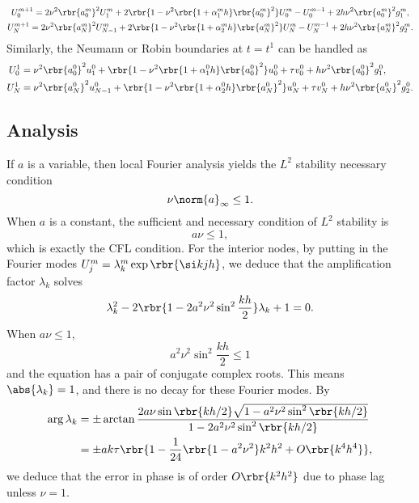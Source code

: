 \documentclass[english, nochinese]{pnote}
\begin{document}
\begin{gather}
U_0^{ m + 1 } = 2 \nu^2 \rbr{a_0^m}^2 U_1^m + 2 \rbr{ 1 - \nu^2 \rbr{ 1 + \alpha_1^m h } \rbr{a_0^m}^2 } U_0^m - U_0^{ m - 1 } + 2 h \nu^2 \rbr{a_0^m}^2 g_1^m, \\
U_N^{ m + 1 } = 2 \nu^2 \rbr{a_N^m}^2 U_{ N - 1 }^m + 2 \rbr{ 1 - \nu^2 \rbr{ 1 + \alpha_2^m h } \rbr{a_N^m}^2 } U_N^m - U_N^{ m - 1 } + 2 h \nu^2 \rbr{a_N^m}^2 g_2^m.
\end{gather}
Similarly, the Neumann or Robin boundaries at $ t = t^1 $ can be handled as
\begin{gather}
\begin{split}
U_0^1 &= \nu^2 \rbr{a_0^0}^2 u^0_1 + \rbr{ 1 - \nu^2 \rbr{ 1 + \alpha_1^0 h } \rbr{a_0^0}^2 } u^0_0 + \tau v^0_0 + h \nu^2 \rbr{a_0^0}^2 g_1^0, \\
U_N^1 &= \nu^2 \rbr{a_N^0}^2 u^0_{ N - 1 } + \rbr{ 1 - \nu^2 \rbr{ 1 + \alpha_2^0 h } \rbr{a_N^0}^2 } u^0_N + \tau v^0_N + h \nu^2 \rbr{a_N^0}^2 g_2^0.
\end{split}
\end{gather}

\subsection{Analysis}

If $a$ is a variable, then local Fourier analysis yields the $L^2$ stability necessary condition
\begin{equation}
\nu \norm{a}_{\infty} \le 1.
\end{equation}
When $a$ is a constant, the sufficient and necessary condition of $L^2$ stability is
\begin{equation}
a \nu \le 1, 
\end{equation}
which is exactly the CFL condition. For the interior nodes, by putting in the Fourier modes $ U_j^m = \lambda_k^m \exp \rbr{ \si k j h } $, we deduce that the amplification factor $\lambda_k$ solves
\begin{equation}
\lambda_k^2 - 2 \rbr{ 1 - 2 a^2 \nu^2 \sin^2 \frac{ k h }{2} } \lambda_k + 1 = 0.
\end{equation}
When $ a \nu \le 1 $,
\begin{equation}
a^2 \nu^2 \sin^2 \frac{ k h }{2} \le 1
\end{equation}
and the equation has a pair of conjugate complex roots. This means $ \abs{\lambda_k} = 1 $, and there is no decay for these Fourier modes. By
\begin{equation}
\begin{split}
\arg \lambda_k &= \pm \arctan \frac{ 2 a \nu \sin \rbr{ k h / 2 } \sqrt{ 1 - a^2 \nu^2 \sin^2 \rbr{ k h / 2 } } }{ 1 - 2 a^2 \nu^2 \sin^2 \rbr{ k h / 2 } } \\
&= \pm a k \tau \rbr{ 1 - \frac{1}{24} \rbr{ 1 - a^2 \nu^2 } k^2 h^2 + O \rbr{ k^4 h^4 } },
\end{split}
\end{equation}
we deduce that the error in phase is of order $ O \rbr{ k^2 h^2 } $ due to phase lag unless $ \nu = 1 $.
\end{document}
